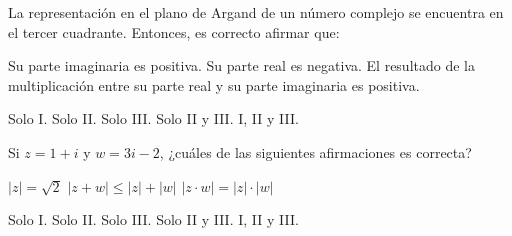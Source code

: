 \documentclass[]{srs}
\begin{document}
\begin{preguntas}[after-item-skip=2cm]
\begin{alternativasgraficas}[raster columns=3]
  \alternativa
\end{alternativasgraficas}

\pregunta La representación en el plano de Argand de un número complejo se encuentra
en el tercer cuadrante. Entonces, es correcto afirmar que:\\
\begin{vertical*}
  \alternativa Su parte imaginaria es positiva.
  \alternativa Su parte real es negativa.
  \alternativa El resultado de la multiplicación entre su parte real y
  su parte imaginaria es positiva.
\end{vertical*}
\begin{vertical}
  \alternativa Solo I.
  \alternativa Solo II.
  \alternativa Solo III.
  \alternativa Solo II y III.
  \alternativa I, II y III.
\end{vertical}

\pregunta Si \hspace{3pt} $z=1+i$ \hspace{3pt} y \hspace{3pt} $w=3i-2$,
  ¿cuáles de las siguientes afirmaciones es correcta?\\
\begin{vertical*}
  \alternativa $|z|=\sqrt{2}$
  \alternativa $|z+w|\le|z|+|w|$
  \alternativa $|z\cdot w|=|z|\cdot|w|$
\end{vertical*}
\begin{vertical}
  \alternativa Solo I.
  \alternativa Solo II.
  \alternativa Solo III.
  \alternativa Solo II y III.
  \alternativa I, II y III.
\end{vertical}


\end{preguntas}
\end{document}
